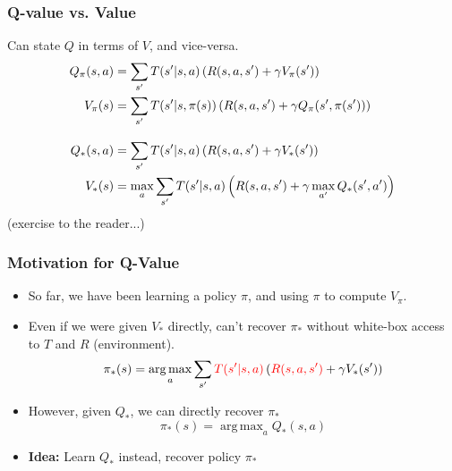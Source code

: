 \documentclass[10pt,a4paper]{beamer}
\DeclareMathOperator*{\argmax}{arg\,max}
\newcommand{\red}[1]{\textcolor{red}{#1}}
\begin{document}
\begin{frame}
	\frametitle{Q-value vs. Value}
	
Can state $Q$ in terms of $V$, and vice-versa.
\begin{align*}
Q_\pi(s,a) &= \sum_{s'} T(s' | s,a) \left( R(s,a,s') + \gamma V_\pi(s') \right) \\
V_\pi(s) &= \sum_{s'} T(s' | s, \pi(s)) \left( R(s,a,s') 
	+ \gamma Q_\pi(s', \pi(s')) \right) \\
	\intertext{\quad}
	Q_*(s,a) &= \sum_{s'} T(s' | s,a) \left( R(s,a,s') + \gamma V_*(s') \right) \\
	V_*(s) &= \max_a \sum_{s'} T(s' | s, a) \left( R(s,a,s') 
	+ \gamma \max_{a'} Q_*(s', a') \right) \\
\end{align*}
\pause
(exercise to the reader...)

\end{frame}


\begin{frame}
	\frametitle{Motivation for Q-Value}
\begin{itemize}
\item So far, we have been learning a policy $\pi$, and using
$\pi$ to compute $V_\pi$.
\pause
\item Even if we were given $V_*$ directly,
can't recover $\pi_*$ without white-box access to $T$ and $R$ (environment).
$$
\pi_*(s) = \argmax_a \sum_{s'} \red{T(s'| s, a)} \left( 
\red{R(s,a,s')} + 
\gamma V_*(s') \right)
$$  \pause
		\item However, given $Q_*$, we can directly recover $\pi_*$
		$$
		\pi_*(s) = \argmax_a Q_*(s,a)
		$$
		\pause
		\item \textbf{Idea:} Learn $Q_*$ instead, recover policy $\pi_*$
\end{itemize}
\end{frame}
\end{document}
